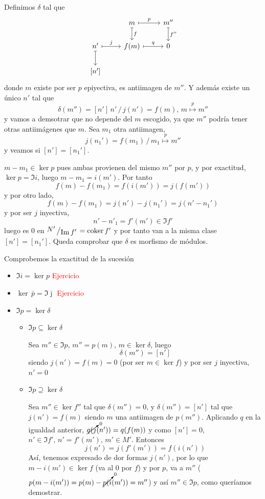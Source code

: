 \begin{dem} Definimos $\delta$ tal que 
$$\bt & m \arrow[mapsto]{d}{f} \arrow[mapsto]{r}{p} & m'' \arrow[mapsto]{d}{f''} \\ 
    n' \arrow[mapsto]{r}{j} \arrow[mapsto]{d}& f(m) \arrow[mapsto]{r}{q} & 0 \\ 
    \left[n'\right]
\et$$donde $m$ existe por ser $p$ epiyectiva, es antiimagen de $m''$. Y adem\'as existe un \'unico $n'$ tal que
$$\delta(m'')= [n'] \, n' \, / \, j(n') = f(m), \, m \overset{p}{\longmapsto} m''$$
y vamos a demsotrar que no depende del $m$ escogido, ya que $m''$ podr\'ia tener otras antiim\'agenes que $m$. Sea $m_1$ otra antiimagen,
$$j(n_1') = f(m_1) \, / \,  m_1 \overset{p}{\longmapsto} m''$$
y veamos si $[n']=[n_1']$.

$m-m_1 \in \ker p$ pues ambas provienen del mismo $m''$ por $p$, y por exactitud, $\ker p = \Im i$, luego $m-m_1 = i(m')$. Por tanto
$$f(m)- f(m_1) = f(i(m')) = j (f(m'))$$ 
y por otro lado, 
$$f(m)- f(m_1) = j(n')-j(n_1')=j(n'-n_1')$$
y por ser $j$ inyectiva, 
$$n'-n'_1 = f'(m') \in \Im f'$$
luego es $0$ en $\modulo{N'}{\Im f'}=\coker f'$ y por tanto van a la misma clase $[n']=[n_1']$. Queda comprobar que $\delta$ es morfismo de m\'odulos.

Comprobemos la exactitud de la sucesi\'on
\begin{itemize} 
\item $\Im i = \ker  p$ \textcolor{red}{Ejercicio}
\item $\ker\, \bar p = \Im \bar \jmath$ \textcolor{red}{Ejercicio}
    \item $\Im p = \ker  \delta$
\begin{itemize}
    \item 
$\Im p \subseteq \ker  \delta$

Sea $m'' \in \Im p$, $m''=p(m), \, m \in \ker  \delta$, luego 
$$\delta(m'')=[n']$$
siendo $j(n')=f(m)=0$ (por ser $m \in \ker  f$) y por ser $j$ inyectiva, $n'=0$

\item $\Im p \supseteq \ker  \delta$

Sea $m'' \in \ker f''$ tal que $\delta(m'')=0$, y $\delta(m'')=[n']$ tal que $j(n')=f(m)$ siendo $m$ una antiimagen de $p(m'')$. Aplicando $q$ en la igualdad anterior, $\cancelto{0}{q(j}(n')) = q(f(m)) $ y como $[n'] = 0$, $n' \in \Im f', \, n'=f'(m'), \, m'\in M'$. Entonces
$$j(n')=j(f'(m')) = f(i(n'))$$
As\'i, tenemos expresado de dor formas $j(n')$, por lo que $m-i(m') \in \ker  f$ (va al 0 por $f$) y por $p$, va a $m''$ ($p(m-i(m')) = p(m) - \cancelto{0}{p(i}(m')) = m''$) y as\'i $m'' \in \Im p$, como quer\'iamos demostrar.  


\end{itemize}
\end{itemize}
\end{dem}

